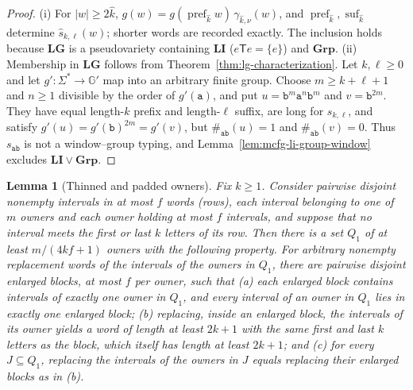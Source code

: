 \documentclass[11pt]{article}
\numberwithin{equation}{section}
\theoremstyle{plain}
\newtheorem{lemma}[theorem]{Lemma}
\theoremstyle{definition}
\theoremstyle{remark}
\theoremstyle{plain}
\begin{document}
\begin{proof}
(i) For $|w|\ge2\hat k$, $g(w)=g(\operatorname{pref}_{\hat k}w)\,\gamma_{\hat k,\nu}(w)$,
and $\operatorname{pref}_{\hat k},\operatorname{suf}_{\hat k}$ determine
$\widehat s_{k,\ell}(w)$; shorter words are recorded exactly.  The inclusion holds because
$\mathbf{LG}$ is a pseudovariety containing $\mathbf{LI}$ ($e\mathsf Te=\{e\}$) and
$\mathbf{Grp}$.
(ii) Membership in $\mathbf{LG}$ follows from
Theorem~\ref{thm:lg-characterization}.  Let $k,\ell\ge0$ and let
$g':\Sigma^*\to {\mathbb G}'$ map into an arbitrary finite group.  Choose
$m\ge k+\ell+1$ and $n\ge1$ divisible by the order of $g'(\mathtt a)$,
and put $u=\mathtt b^m\mathtt a^{n}\mathtt b^m$ and
$v=\mathtt b^{2m}$.  They have equal length-$k$ prefix and
length-$\ell$ suffix, are long for $s_{k,\ell}$, and satisfy
$g'(u)=g'(\mathtt b)^{2m}=g'(v)$, but
$\#_{\mathtt{ab}}(u)=1$ and $\#_{\mathtt{ab}}(v)=0$.
Thus $s_{\mathtt{ab}}$ is not a window--group typing, and
Lemma~\ref{lem:mcfg-li-group-window} excludes
$\mathbf{LI}\vee\mathbf{Grp}$.
\end{proof}

\begin{lemma}[Thinned and padded owners]
\label{lem:lg-buffered-owners}
Fix $k\ge1$.  Consider pairwise disjoint nonempty intervals in at most $f$
words (\emph{rows}), each interval belonging to one of $m$ owners and each
owner holding at most $f$ intervals, and suppose that no interval meets the
first or last $k$ letters of its row.  Then there is a set $Q_1$ of at least
$m/(4kf+1)$ owners with the following property.  For arbitrary nonempty
replacement words of the intervals of the owners in $Q_1$, there are pairwise
disjoint \emph{enlarged blocks}, at most $f$ per owner, such that
\textup{(a)} each enlarged block contains intervals of exactly one owner in
$Q_1$, and every interval of an owner in $Q_1$ lies in exactly one enlarged
block; \textup{(b)} replacing, inside an enlarged block, the intervals of its
owner yields a word of length at least $2k+1$ with the same first and last
$k$ letters as the block, which itself has length at least $2k+1$; and
\textup{(c)} for every $J\subseteq Q_1$, replacing the intervals of the owners
in $J$ equals replacing their enlarged blocks as in \textup{(b)}.
\end{lemma}
\end{document}
